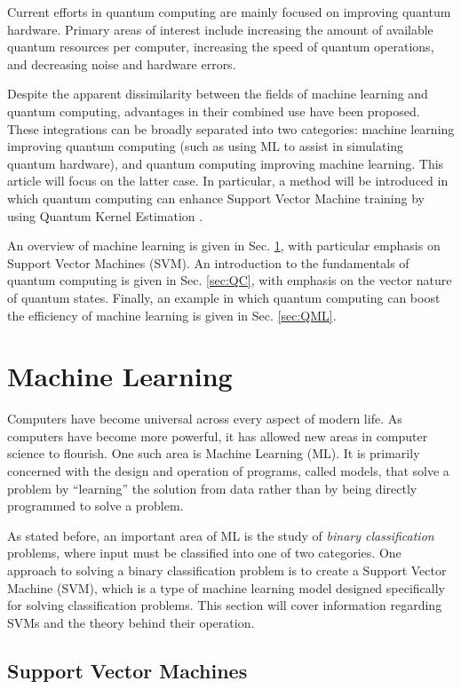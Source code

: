 \documentclass[%
 reprint,
nofootinbib,
 amsmath,amssymb,
 aps,
]{revtex4-2}
\begin{document}
Current efforts in quantum computing are mainly focused on improving quantum hardware. Primary areas of interest include increasing the amount of available quantum resources per computer, increasing the speed of quantum operations, and decreasing noise and hardware errors.

Despite the apparent dissimilarity between the fields of machine learning and quantum computing, advantages in their combined use have been proposed. These integrations can be broadly separated into two categories: machine learning improving quantum computing (such as using ML to assist in simulating quantum hardware), and quantum computing improving machine learning. This article will focus on the latter case. In particular, a method will be introduced in which quantum computing can enhance Support Vector Machine training by using Quantum Kernel Estimation \cite{noauthor_seeking_2023, russo_quantum_2023}.

An overview of machine learning is given in Sec. \ref{sec:ML}, with particular emphasis on Support Vector Machines (SVM). An introduction to the fundamentals of quantum computing is given in Sec. \ref{sec:QC}, with emphasis on the vector nature of quantum states. Finally, an example in which quantum computing can boost the efficiency of machine learning is given in Sec. \ref{sec:QML}.

\section{Machine Learning}
\label{sec:ML}

Computers have become universal across every aspect of modern life. As computers have become more powerful, it has allowed new areas in computer science to flourish. One such area is Machine Learning (ML). It is primarily concerned with the design and operation of programs, called models, that solve a problem by ``learning'' the solution from data rather than by being directly programmed to solve a problem.

As stated before, an important area of ML is the study of \textit{binary classification} problems, where input must be classified into one of two categories. One approach to solving a binary classification problem is to create a Support Vector Machine (SVM), which is a type of machine learning model designed specifically for solving classification problems. This section will cover information regarding SVMs and the theory behind their operation.

\subsection{Support Vector Machines}
\end{document}

